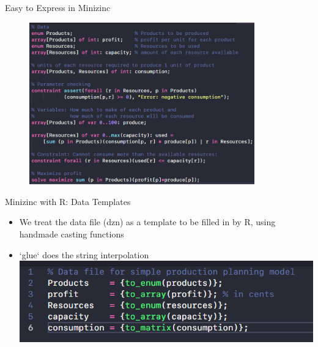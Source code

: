 \documentclass[xcolor=dvipsnames,aspectratio=169]{beamer}
\begin{document}
\begin{frame}{Easy to Express in Minizinc}
    \begin{figure}[t]
     \includegraphics[height = 70mm, pos = center]{mz_production_model.png}
    \centering
    \end{figure}
\end{frame}

\begin{frame}{Minizinc with R: Data Templates}
   \begin{itemize}
    \item We treat the data file (dzn) as a template to be filled in by R, using handmade casting functions
    \item `glue` does the string interpolation
    \includegraphics[scale = 0.65]{mz_production_data_2.png} 
   \end{itemize}
    
\end{frame}
\end{document}
